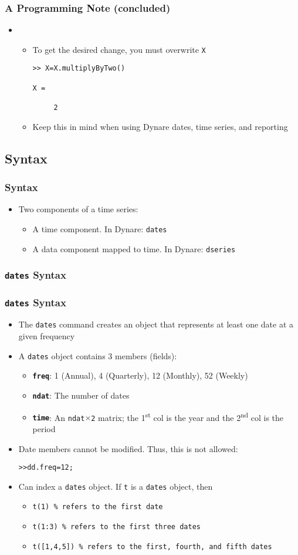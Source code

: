 \documentclass[10pt]{beamer}
\newcommand{\myitem}{\item[$\bullet$]}
\begin{document}
\begin{frame}[fragile,t]
  \frametitle{A Programming Note (concluded)}
  \begin{itemize}
    \item[] \begin{itemize}
    \myitem To get the desired change, you must overwrite \texttt{X}
\begin{verbatim}
>> X=X.multiplyByTwo()

X =

     2
\end{verbatim}
\myitem Keep this in mind when using Dynare dates, time series, and reporting
  \end{itemize}
  \end{itemize}
\end{frame}


\subsection{Syntax}
\begin{frame}[fragile,t]
  \frametitle{Syntax}
  \begin{itemize}
  \myitem Two components of a time series:
    \begin{itemize}
    \myitem A time component. In Dynare: \texttt{dates}
    \myitem A data component mapped to time. In Dynare: \texttt{dseries}
    \end{itemize}
  \end{itemize}
\end{frame}

\subsubsection{\texttt{dates} Syntax}
\begin{frame}[fragile,t]
  \frametitle{\texttt{dates} Syntax}
  \begin{itemize}
    \myitem The \texttt{dates} command creates an object that represents at least one date at a given frequency
    \myitem A \texttt{dates} object contains 3 members (fields):
    \begin{itemize}
      \myitem{\textbf{\texttt{freq}}}: 1 (Annual), 4 (Quarterly), 12 (Monthly), 52 (Weekly)
      \myitem{\textbf{\texttt{ndat}}}: The number of dates
      \myitem{\textbf{\texttt{time}}}: An \texttt{ndat$\times$2} matrix; the 1\textsuperscript{st} col is the year and the 2\textsuperscript{nd} col is the period
    \end{itemize}
    \myitem Date members cannot be modified. Thus, this is not allowed:
\begin{alltt}
  >> dd.freq = 12;
\end{alltt}
    \myitem Can index a \texttt{dates} object. If \texttt{t} is a \texttt{dates} object, then
    \begin{itemize}
      \myitem \texttt{t(1) \% refers to the first date}
      \myitem \texttt{t(1:3) \% refers to the first three dates}
      \myitem \texttt{t([1,4,5]) \% refers to the first, fourth, and fifth dates}
    \end{itemize}
  \end{itemize}
\end{frame}
\end{document}
